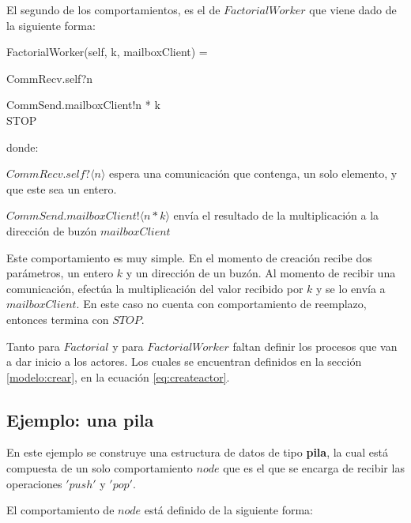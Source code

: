 El segundo de los comportamientos, es el de $FactorialWorker$ que viene dado de la siguiente forma:

\begin{process}
FactorialWorker(self, k, mailboxClient) = {} \\ \quad
  \begin{block}
  CommRecv.self?\langle n \rangle \then {} \\ \quad
    \begin{block}
    CommSend.mailboxClient!\langle n * k \rangle \then \\
    STOP
    \end{block}
  \end{block}
\end{process}
donde:
\begin{description}
 \item $CommRecv.self?\langle n \rangle$ espera una comunicación que contenga, un solo elemento, y que este sea un entero.
 \item $CommSend.mailboxClient!\langle n * k \rangle$ envía el resultado de la multiplicación a la dirección de buzón $mailboxClient$
\end{description}

Este comportamiento es muy simple. En el momento de creación recibe dos parámetros, un entero $k$ y un dirección de un buzón. Al momento de recibir una comunicación, efectúa la multiplicación del valor recibido por $k$ y se lo envía a $mailboxClient$. En este caso no cuenta con comportamiento de reemplazo, entonces termina con $STOP$.

Tanto para $Factorial$ y para $FactorialWorker$ faltan definir los procesos que van a dar inicio a los actores. Los cuales se encuentran definidos en la sección \ref{modelo:crear},  en la ecuación \eqref{eq:createactor}.

\subsection{Ejemplo: una pila}
En este ejemplo se construye una estructura de datos de tipo \textbf{pila}, la cual está compuesta de un solo comportamiento $node$ que es el que se encarga de recibir las operaciones $'push'$ y $'pop'$.

El comportamiento de $node$ está definido de la siguiente forma:

